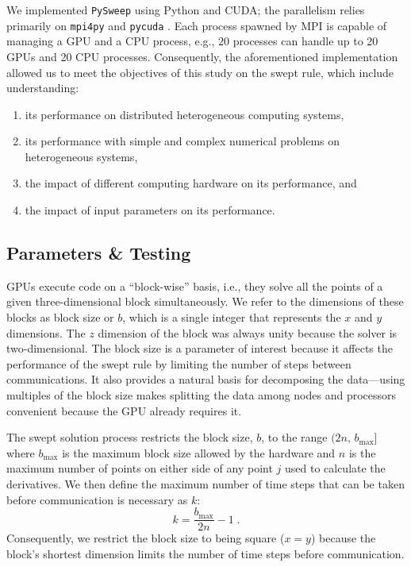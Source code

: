 \documentclass[preprints,article,accept,moreauthors,pdftex]{Definitions/mdpi}
\def\pysweep{\texttt{PySweep}}
\begin{document}
We implemented \pysweep{} using Python and CUDA; the parallelism relies primarily on \texttt{mpi4py} \cite{DalcinMPIPython} and \texttt{pycuda} \cite{KlocknerPyCUDAGeneration}. Each process spawned by MPI is capable of managing a GPU and a CPU process, e.g., 20 processes can handle up to 20 GPUs and 20 CPU processes. Consequently, the aforementioned implementation allowed us to meet the objectives of this study on the swept rule, which include understanding:
\begin{enumerate}
    \item its performance on distributed heterogeneous computing systems,
    \item its performance with simple and complex numerical problems on heterogeneous systems,
    \item the impact of different computing hardware on its performance, and
    \item the impact of input parameters on its performance.
\end{enumerate}

\subsection{Parameters \& Testing}
\label{parameters-section}

GPUs execute code on a ``block-wise'' basis, i.e., they solve all the points of a given three-dimensional block simultaneously. We refer to the dimensions of these blocks as block size or $b$, which is a single integer that represents the $x$ and $y$ dimensions. 
The $z$ dimension of the block was always unity because the solver is two-dimensional. The block size is a parameter of interest because it affects the performance of the swept rule by limiting the number of steps between communications. 
It also provides a natural basis for decomposing the data---using multiples of the block size makes splitting the data among nodes and processors convenient because the GPU already requires it.

The swept solution process restricts the block size, $b$, to the range $(2n,\,b_{\max}]$ where $b_{\max}$ is the maximum block size allowed by the hardware and $n$ is the maximum number of points on either side of any point $j$ used to calculate the derivatives. We then define the maximum number of time steps that can be taken before communication is necessary as $k$:
\begin{equation}
    \label{blocksize-equation}
    k = \frac{b_{\max}}{2n}-1 \;.
\end{equation}
Consequently, we restrict the block size to being square ($x=y$) because the block's shortest dimension limits the number of time steps before communication. 
\end{document}
